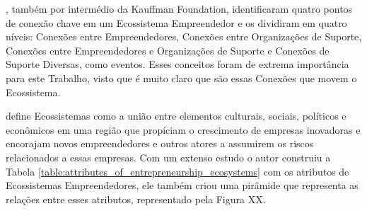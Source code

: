 , também por intermédio da Kauffman Foundation, identificaram quatro pontos de conexão chave em um Ecossistema Empreendedor e os dividiram em quatro níveis: Conexões entre Empreendedores, Conexões entre Organizações de Suporte, Conexões entre Empreendedores e Organizações de Suporte e Conexões de Suporte Diversas, como eventos. Esses conceitos foram de extrema importância para este Trabalho, visto que é muito claro que são essas Conexões que movem o Ecossistema.

 define Ecossistemas como a união entre elementos culturais, sociais, políticos e econômicos em uma região que propíciam o crescimento de empresas inovadoras e encorajam novos empreendedores e outros atores a assumirem os riscos relacionados a essas empresas. Com um extenso estudo o autor construiu a Tabela \ref{table:attributes_of_entrepreneurship_ecosystems} com os atributos de Ecossistemas Empreendedores, ele também criou uma pirâmide que representa as relações entre esses atributos, representado pela Figura XX.

